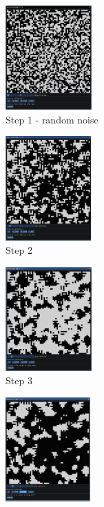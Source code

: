 \documentclass[12pt]{report}
\begin{document}
\begin{figure}[H]
	\centering
	\begin{subfigure}[t]{0.3\textwidth}
		\centering
		\includegraphics[height=4cm]{images/s_1}
		\caption{Step 1 - random noise} 
	\end{subfigure} \hspace{1em}
	\begin{subfigure}[t]{0.3\textwidth}
		\centering
		\includegraphics[height=4cm]{images/s_2}
		\caption{Step 2} 
	\end{subfigure} \hspace{1em}
	\begin{subfigure}[t]{0.3\textwidth}
		\centering
		\includegraphics[height=4cm]{images/s_3}
		\caption{Step 3} 
	\end{subfigure} \hspace{1em}
	\begin{subfigure}[t]{0.3\textwidth}
		\centering
		\includegraphics[height=4cm]{images/s_4}

\end{subfigure}
\end{figure}
\end{document}
